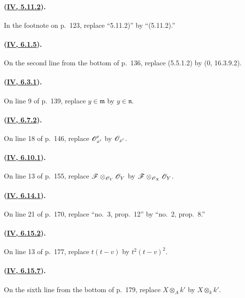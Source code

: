 \paragraph{({\texorpdfstring{\protect\hyperref[IV.5.11.2]{IV, 5.11.2}}{IV, 5.11.2}}).}
In the footnote on p.~123, replace ``5.11.2)'' by ``(5.11.2).''

\paragraph{({\texorpdfstring{\protect\hyperref[IV.6.1.5]{IV, 6.1.5}}{IV, 6.1.5}}).}
On the second line from the bottom of p.~136, replace (5.5.1.2) by
($0$, 16.3.9.2).

\paragraph{({\texorpdfstring{\protect\hyperref[IV.6.3.1]{IV, 6.3.1}}{IV, 6.3.1}}).}
On line 9 of p.~139, replace $y\in\mathfrak m$ by $y\in\mathfrak n$.

\paragraph{({\texorpdfstring{\protect\hyperref[IV.6.7.2]{IV, 6.7.2}}{IV, 6.7.2}}).}
On line 18 of p.~146, replace $\mathscr{O}'_{x'}$ by $\mathscr{O}_{x'}$.

\paragraph{({\texorpdfstring{\protect\hyperref[IV.6.10.1]{IV, 6.10.1}}{IV, 6.10.1}}).}
On line 13 of p.~155, replace
$\mathscr{F}\otimes_{\mathscr{O}_Y}\mathscr{O}_Y$ by
$\mathscr{F}\otimes_{\mathscr{O}_X}\mathscr{O}_Y$.

\paragraph{({\texorpdfstring{\protect\hyperref[IV.6.14.1]{IV, 6.14.1}}{IV, 6.14.1}}).}
On line 21 of p.~170, replace ``no.~3, prop.~12'' by
``no.~2, prop.~8.''

\paragraph{({\texorpdfstring{\protect\hyperref[IV.6.15.2]{IV, 6.15.2}}{IV, 6.15.2}}).}
On line 13 of p.~177, replace $t(t-v)$ by $t^2(t-v)^2$.

\paragraph{({\texorpdfstring{\protect\hyperref[IV.6.15.7]{IV, 6.15.7}}{IV, 6.15.7}}).}
On the sixth line from the bottom of p.~179, replace
$X\otimes_Ak'$ by $X\otimes_kk'$.

